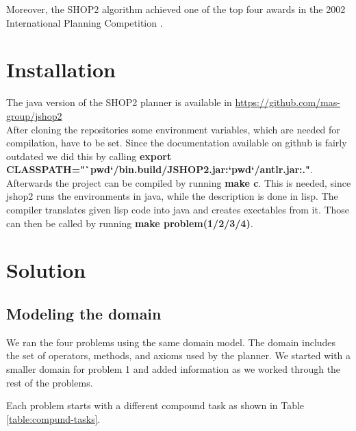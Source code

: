 \documentclass[paper=a4, fontsize=11pt]{scrartcl}
\begin{document}
 	Moreover, the SHOP2 algorithm achieved one of the top four awards in the 2002 International Planning Competition \cite{Nau2003}.

 	\section{Installation}

 	The java version of the SHOP2 planner is available in \url{https://github.com/mas-group/jshop2} \\

 	After cloning the repositories some environment variables, which are needed for compilation, have to be set. Since the documentation available on github is fairly outdated we did this by calling \textbf{export CLASSPATH="`pwd`/bin.build/JSHOP2.jar:`pwd`/antlr.jar:."}. Afterwards the project can be compiled by running \textbf{make c}. This is needed, since jshop2 runs the environments in java, while the description is done in lisp. The compiler translates given lisp code into java and creates exectables from it.
 	Those can then be called by running \textbf{make problem(1/2/3/4)}.



	\section{Solution}

	\subsection{Modeling the domain}

	We ran the four problems using the same domain model. The domain includes the set of operators, methods, and axioms used by the planner. We started with a smaller domain for problem 1 and added information as we worked through the rest of the problems.

	Each problem starts with a different compound task as shown in Table \ref{table:compund-tasks}.
\end{document}
